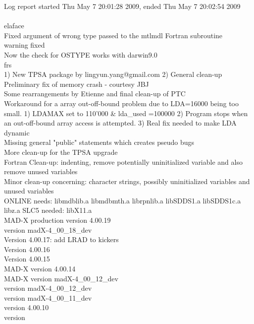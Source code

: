 Log report started Thu May  7 20:01:28 2009, ended Thu May  7 20:02:54 2009
\\
\\
elaface \\ 
 Fixed argument of wrong type passed to the mtlmdl Fortran subroutine  \\ 
  warning fixed  \\ 
 Now the check for OSTYPE works with darwin9.0  \\ 
frs \\ 
1) New TPSA package by lingyun.yang@gmail.com 2) General clean-up  \\ 
Preliminary fix of memory crash - courtesy JBJ  \\ 
Some rearrangements by Etienne and final clean-up of PTC  \\ 
Workaround for a array out-off-bound problem due to LDA=16000 being too small. 1) LDAMAX set to 110'000 \& lda\_used =100000 2) Program stops when an out-off-bound array access is attempted. 3) Real fix needed to make LDA dynamic  \\ 
Missing general "public" statements which creates pseudo bugs  \\ 
More clean-up for the TPSA upgrade  \\ 
Fortran Clean-up: indenting, remove potentially uninitialized variable and also remove unused variables  \\ 
Minor clean-up concerning: character strings, possibly uninitialized variables and unused variables  \\ 
ONLINE needs: libmdblib.a libmdbmth.a librpnlib.a libSDDS1.a libSDDS1c.a libz.a SLC5 needed: libX11.a  \\ 
MAD-X production version 4.00.19  \\ 
version madX-4\_00\_18\_dev  \\ 
Version 4.00.17: add LRAD to kickers  \\ 
Version 4.00.16  \\ 
Version 4.00.15  \\ 
MAD-X version 4.00.14  \\ 
MAD-X version madX-4\_00\_12\_dev  \\ 
version madX-4\_00\_12\_dev  \\ 
version madX-4\_00\_11\_dev  \\ 
version 4.00.10  \\ 
version  \\ 
